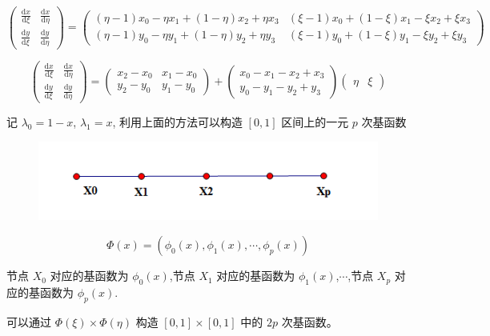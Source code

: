 \documentclass[12pt,a4paper]{article}
\begin{document}
$$
\begin{pmatrix}
\frac{\mathrm d x}{\mathrm d \xi} & \frac{\mathrm d x}{\mathrm d\eta}\\
\frac{\mathrm d y}{\mathrm d \xi} & \frac{\mathrm d y}{\mathrm d\eta}
\end{pmatrix}
=
\begin{pmatrix}
(\eta - 1)x_0 -\eta x_1 + (1 - \eta) x_2 + \eta x_3 & (\xi - 1)x_0 + (1 - \xi) x_1  - \xi x_2 + \xi x_3\\
(\eta - 1)y_0 -\eta y_1 + (1 - \eta) y_2 + \eta y_3 & (\xi - 1)y_0 + (1 - \xi) y_1  - \xi y_2 + \xi y_3
\end{pmatrix}
$$

$$
\begin{pmatrix}
\frac{\mathrm d x}{\mathrm d \xi} & \frac{\mathrm d x}{\mathrm d\eta}\\
\frac{\mathrm d y}{\mathrm d \xi} & \frac{\mathrm d y}{\mathrm d\eta}
\end{pmatrix}
=
\begin{pmatrix}
x_2 - x_0 & x_1 - x_0\\
y_2 - y_0 & y_1 - y_0
\end{pmatrix}
+
\begin{pmatrix}
x_0 - x_1 - x_2 + x_3\\
y_0 - y_1 - y_2 + y_3
\end{pmatrix}
\begin{pmatrix}
\eta & \xi
\end{pmatrix}
$$

记 $\lambda_0 = 1-x$, $\lambda_1 = x$, 利用上面的方法可以构造 $[0, 1]$ 区间上的一元 $p$ 次基函数

\begin{figure}[H]
\centering
\includegraphics[scale=0.7]{./figures/5.png}
\caption{}
\end{figure}


$$
\Phi(x) = (\phi_0(x), \phi_1(x), \cdots, \phi_{p}(x))
$$

节点 $X_0$ 对应的基函数为 $\phi_0(x)$,节点 $X_1$ 对应的基函数为 $\phi_1(x)$,$\cdots$,节点 $X_p$ 对应的基函数为 $\phi_p(x)$.

可以通过 $\Phi(\xi) \times \Phi(\eta)$ 构造 $[0, 1] \times [0, 1]$ 中的 $2p$ 次基函数。
\end{document}

